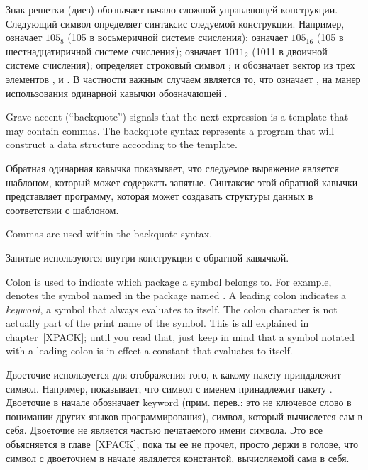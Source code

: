 \begin{indentdesc}{1.2pc}
\item[\cd{\#}] Знак решетки (диез) обозначает начало сложной управляющей
конструкции. Следующий символ определяет синтаксис следуемой конструкции.
Например,  означает $105_{8}$ (105 в восьмеричной системе счисления);
 означает $105_{16}$ (105 в шестнадцатиричной системе счисления);
 означает $1011_{2}$ (1011 в двоичной системе счисления);
 определяет строковый символ ; и 
обозначает вектор из трех элементов ,  и . В частности важным
случаем является то, что  означает , на
манер использования одинарной кавычки  обозначающей .

\item[\cd{{\Xbq}}] Grave accent (``backquote'') signals that
the next expression is a template that may contain commas.  The backquote syntax
represents a program that will construct a data structure
according to the template.

\item[\cd{{\Xbq}}] Обратная одинарная кавычка показывает, что следуемое
выражение является шаблоном, который может содержать запятые. Синтаксис этой
обратной кавычки представляет программу, которая может создавать структуры
данных в соответствии с шаблоном.

\item[\cd{,}] Commas are used within the backquote syntax.

\item[\cd{,}] Запятые используются внутри конструкции с обратной кавычкой.

\item[\cd{:}] Colon is used to indicate which package a
symbol belongs to. For example,  denotes the symbol named
 in the package named .  A leading colon indicates a {\it
keyword}, a symbol that always evaluates to itself.
The colon character is not actually part of the print name
of the symbol.
This is all explained in chapter~\ref{XPACK}; until you read
that, just keep in mind that a symbol notated with a leading colon
is in effect a constant that evaluates to itself.

\item[\cd{:}] Двоеточие используется для отображения того, к какому пакету
приндалежит символ. Например,  показывает, что символ с
именем  принадлежит пакету . Двоеточие в начале обозначает 
keyword (прим. перев.: это не ключевое слово в понимании других языков 
программирования), символ, который вычислется сам в себя. Двоеточие не является
частью печатаемого имени символа. 
Это все объясняется в главе~\ref{XPACK}; пока ты ее не прочел, просто держи в
голове, что символ с двоеточием в начале являлется константой, вычисляемой сама
в себя.
\end{indentdesc}

